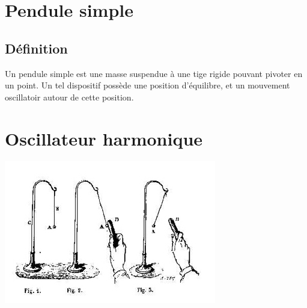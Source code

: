 
\section{Pendule simple}
%


\subsection{Définition}

Un pendule simple est une masse suspendue à une tige rigide pouvant pivoter en un point. Un tel dispositif possède une position d'équilibre, et un mouvement oscillatoir autour de cette position.



\section{Oscillateur harmonique}

\begin{center}
\includegraphics[scale=0.9]{./theorieDesChamps/MascartTraiteDElectriciteStatique1876}
\end{center}

